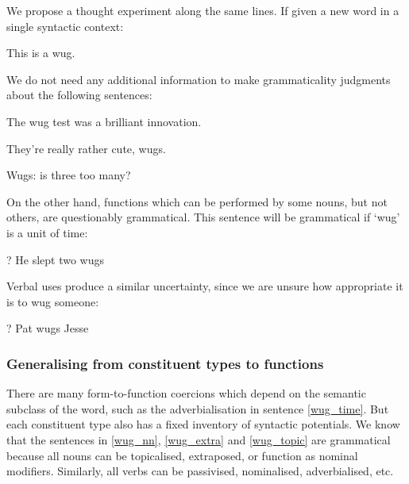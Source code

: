 \documentclass[11pt,twoside,final]{ahudson-harvard}
\begin{document}
We propose a thought experiment along the same lines. If given a new word in a single syntactic context:

\begin{lexamples}
\centering
 \item This is a wug.
\end{lexamples}

We do not need any additional information to make grammaticality judgments about the following sentences:

\begin{lexamples}
\centering
 \item The wug test was a brilliant innovation.\label{wug_nn}
 \item They're really rather cute, wugs.\label{wug_extra}
 \item Wugs: is three too many?\label{wug_topic}
\end{lexamples}


On the other hand, functions which can be performed by some nouns, but not others, are questionably grammatical. This sentence will be grammatical if `wug' is a unit of time:

\begin{lexamples}
\centering
\item ? He slept two wugs\label{wug_time}
\end{lexamples}

Verbal uses produce a similar uncertainty, since we are unsure how appropriate it is to wug someone:

\begin{lexamples}
\centering
\item ? Pat wugs Jesse
\end{lexamples}

\subsubsection{Generalising from constituent types to functions}

There are many form-to-function coercions which depend on the semantic subclass of the word, such as the adverbialisation in sentence \ref{wug_time}. But each constituent type also has a fixed inventory of syntactic potentials. We know that the sentences in \ref{wug_nn}, \ref{wug_extra} and \ref{wug_topic} are grammatical because all nouns can be topicalised, extraposed, or function as nominal modifiers. Similarly, all verbs can be passivised, nominalised, adverbialised, etc.
\end{document}
